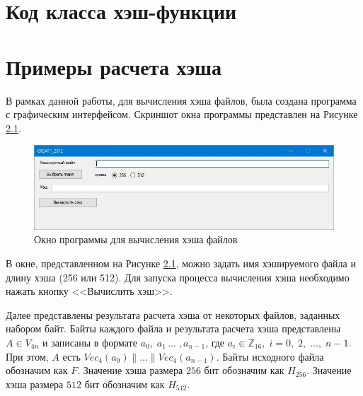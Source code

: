 \chapter{Код класса хэш-функции}

\chapter{Примеры расчета хэша}
В рамках данной работы, для вычисления хэша файлов, была создана программа с графическим интерфейсом. Скриншот окна программы представлен на Рисунке \ref{fig:figB_1}.
\begin{figure}[H]
	\centering
	\includegraphics[width=1.0\linewidth]{inc/img/b1}
	\caption{Окно программы для вычисления хэша файлов}
	\label{fig:figB_1}
\end{figure}
\par
В окне, представленном на Рисунке \ref{fig:figB_1}, можно задать имя хэшируемого файла и длину хэша (256 или 512). Для запуска процесса вычисления хэша необходимо нажать кнопку <<Вычислить хэш>>.
\par
Далее представлены результата расчета хэша от некоторых файлов, заданных набором байт. Байты каждого файла и результата расчета хэша представлены $A \in V_{4n}$ и записаны в формате $a_0,\;a_1\,\dots\;,a_{n-1}$, где $a_i\in\mathbb{Z}_{16},\;i=0,\;2,\;\dots,\;n-1$. При этом, $A$ есть $Vec_4(a_0)\|\dots\|Vec_4(a_{n-1})$. Байты исходного файла обозначим как $F$. Значение хэша размера $256$ бит обозначим как $H_{256}$. Значение хэша размера $512$ бит обозначим как $H_{512}$.
